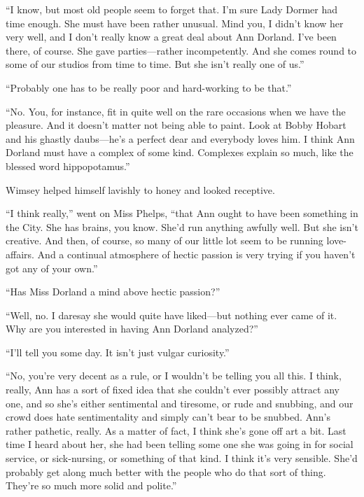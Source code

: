 \enquote{I know, but most old people seem to forget that. I'm sure Lady Dormer had time enough. She must have been rather unusual. Mind you, I didn't know her very well, and I don't really know a great deal about Ann Dorland. I've been there, of course. She gave parties\allowbreak---\allowbreak rather incompetently. And she comes round to some of our studios from time to time. But she isn't really one of us.}

\enquote{Probably one has to be really poor and hard-working to be that.}

\enquote{No. You, for instance, fit in quite well on the rare occasions when we have the pleasure. And it doesn't matter not being able to paint. Look at Bobby Hobart and his ghastly daubs\allowbreak---\allowbreak he's a perfect dear and everybody loves him. I think Ann Dorland must have a complex of some kind. Complexes explain so much, like the blessed word hippopotamus.}

Wimsey helped himself lavishly to honey and looked receptive.

\enquote{I think really,} went on Miss Phelps, \enquote{that Ann ought to have been something in the City. She has brains, you know. She'd run anything awfully well. But she isn't creative. And then, of course, so many of our little lot seem to be running love-affairs. And a continual atmosphere of hectic passion is very trying if you haven't got any of your own.}

\enquote{Has Miss Dorland a mind above hectic passion?}

\enquote{Well, no. I daresay she would quite have liked\allowbreak---\allowbreak but nothing ever came of it. Why are you interested in having Ann Dorland analyzed?}

\enquote{I'll tell you some day. It isn't just vulgar curiosity.}

\enquote{No, you're very decent as a rule, or I wouldn't be telling you all this. I think, really, Ann has a sort of fixed idea that she couldn't ever possibly attract any one, and so she's either sentimental and tiresome, or rude and snubbing, and our crowd does hate sentimentality and simply can't bear to be snubbed. Ann's rather pathetic, really. As a matter of fact, I think she's gone off art a bit. Last time I heard about her, she had been telling some one she was going in for social service, or sick-nursing, or something of that kind. I think it's very sensible. She'd probably get along much better with the people who do that sort of thing. They're so much more solid and polite.}

